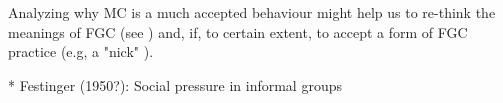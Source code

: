 \documentclass[12pt,]{article}
\newcommand{\comment}[1]{\textbf{[[#1]]}}
\newcommand{\cfcmt}[1]{\comment{CFS: #1}}
\begin{document}





Analyzing why MC is a much accepted behaviour might help us to re-think the meanings of FGC (see \cite{DarbSvob07}) and, if, to certain extent, to accept a form of FGC practice (e.g, a "nick" \cite{Wade11}).



 * Festinger (1950?):  Social pressure in informal groups

\end{document}
